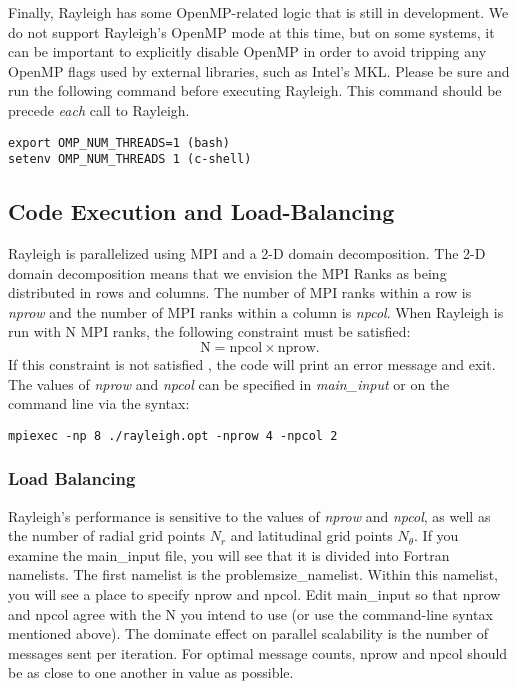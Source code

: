 Finally, Rayleigh has some OpenMP-related logic that is still in development.  We do not support Rayleigh's OpenMP mode at this time, but on some systems, it can be important to explicitly disable OpenMP in order to avoid tripping any OpenMP flags used by external libraries, such as Intel's MKL.  Please be sure and run the following command before executing Rayleigh.  This command should be precede \textit{each} call to Rayleigh. 
\begin{lstlisting}
export OMP_NUM_THREADS=1 (bash)
setenv OMP_NUM_THREADS 1 (c-shell)
\end{lstlisting}


\subsection{Code Execution and Load-Balancing}
Rayleigh is parallelized using MPI and a 2-D domain decomposition. The 2-D domain decomposition means that we envision the MPI Ranks as being distributed in rows and columns.  The number of MPI ranks within a row is \textit{nprow} and the number of MPI ranks within a column is \textit{npcol}.  When Rayleigh is run with N MPI ranks, the following constraint must be satisfied:
\begin{equation}
\mathrm{N} = \mathrm{npcol} \times \mathrm{nprow}   .
\end{equation}
If this constraint is not satisfied , the code will print an error message and exit.  The values of \textit{nprow} and \textit{npcol} can be specified in \textit{main\_input} or on the command line via the syntax:
\begin{lstlisting}
mpiexec -np 8 ./rayleigh.opt -nprow 4 -npcol 2
\end{lstlisting}

\subsubsection{Load Balancing}
Rayleigh's performance is sensitive to the values of \textit{nprow} and \textit{npcol}, as well as the number of radial grid points $N_r$ and latitudinal grid points $N_\theta$.   If you examine the main\_input file,  you will see that it is divided into Fortran namelists.  The first namelist is the problemsize\_namelist.  Within this namelist, you will see a place to specify nprow and npcol.  Edit main\_input so that nprow and npcol agree with the N you intend to use (or use the command-line syntax mentioned above).  The dominate effect on parallel scalability is the number of messages sent per iteration.  For optimal message counts, nprow and npcol should be as close to one another in value as possible.  

